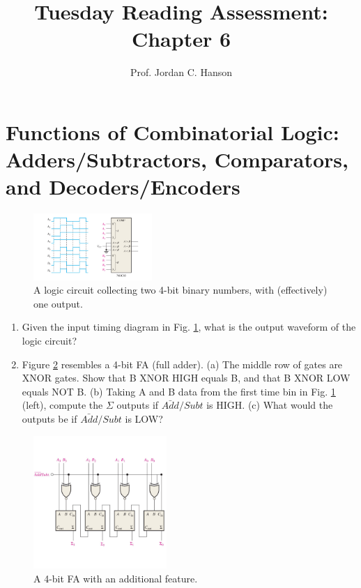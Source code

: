 \documentclass{article}
\begin{document}
\title{Tuesday Reading Assessment: Chapter 6}
\author{Prof. Jordan C. Hanson}

\maketitle

\section{Functions of Combinatorial Logic: Adders/Subtractors, Comparators, and Decoders/Encoders}

\begin{figure}[ht]
\centering
\includegraphics[width=0.4\textwidth,trim=2cm 0cm 2cm 0cm,clip=true]{figures/quiz2.pdf}
\caption{\label{fig:quiz1} A logic circuit collecting two 4-bit binary numbers, with (effectively) one output.}
\end{figure}

\begin{enumerate}
\item Given the input timing diagram in Fig. \ref{fig:quiz1}, what is the output waveform of the logic circuit? \\ \vspace{1cm}
\item Figure \ref{fig:quiz2} resembles a 4-bit FA (full adder).  (a) The middle row of gates are XNOR gates.  Show that B XNOR HIGH equals B, and that B XNOR LOW equals NOT B.  (b) Taking A and B data from the first time bin in Fig. \ref{fig:quiz1} (left), compute the $\Sigma$ outputs if $\bar{Add}/Subt$ is HIGH. (c) What would the outputs be if $\bar{Add}/Subt$ is LOW?
\end{enumerate}

\begin{figure}[hb]
\centering
\includegraphics[width=0.45\textwidth,trim=0cm 2cm 0cm 2cm,clip=true]{figures/quiz1.pdf}
\caption{\label{fig:quiz2} A 4-bit FA with an additional feature.}
\end{figure}
\end{document}
